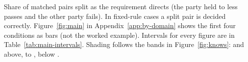 \begin{table}[t]
\par{}
\caption{Share of matched pairs split as the requirement directs (the party held to less passes and the other party fails). In fixed-rule cases a split pair is decided correctly. Figure~\ref{fig:main} in Appendix~\ref{app:by-domain} shows the first four conditions as bars (not the worked example). Intervals for every figure are in Table~\ref{tab:main-intervals}. Shading follows the bands in Figure~\ref{fig:knows}: \BandGreenFrom{} and above, \BandAmberFrom{} to \BandGreenFrom{}, below \BandAmberFrom{}.}
\label{tab:main}
\end{table}
